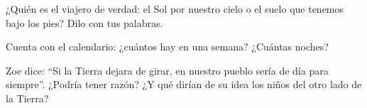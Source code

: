 \begin{exercise}[$\star$]\label{exo:g1:day-and-night:7}
¿Quién es el viajero de verdad: el Sol por nuestro cielo o el suelo
que tenemos bajo los pies? Dilo con tus palabras.
\end{exercise}

\begin{exercise}[$\star$]\label{exo:g1:day-and-night:8}
Cuenta con el calendario: ¿cuántos  hay en una semana?
¿Cuántas noches?
\end{exercise}

\begin{exercise}[$\star\star$]\label{exo:g1:day-and-night:9}
Zoe dice: ``Si la Tierra dejara de girar, en nuestro pueblo sería de
día para siempre''. ¿Podría tener razón? ¿Y qué dirían de su idea los
niños del otro lado de la Tierra?
\end{exercise}
